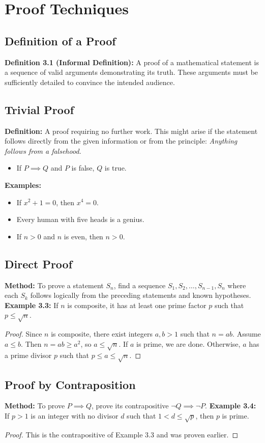 \section{Proof Techniques}

\subsection*{Definition of a Proof}
\textbf{Definition 3.1 (Informal Definition):} A proof of a mathematical statement is a sequence of valid arguments demonstrating its truth. These arguments must be sufficiently detailed to convince the intended audience.

\subsection*{Trivial Proof}
\textbf{Definition:} A proof requiring no further work. This might arise if the statement follows directly from the given information or from the principle: \emph{Anything follows from a falsehood.}
\begin{itemize}
    \item If $P \implies Q$ and $P$ is false, $Q$ is true.
\end{itemize}
\textbf{Examples:}
\begin{itemize}
    \item If $x^2 + 1 = 0$, then $x^4 = 0$.
    \item Every human with five heads is a genius.
    \item If $n > 0$ and $n$ is even, then $n > 0$.
\end{itemize}

\subsection*{Direct Proof}
\textbf{Method:} To prove a statement $S_n$, find a sequence $S_1, S_2, \dots, S_{n-1}, S_n$ where each $S_k$ follows logically from the preceding statements and known hypotheses.
\textbf{Example 3.3:} If $n$ is composite, it has at least one prime factor $p$ such that $p \leq \sqrt{n}$.
\begin{proof}
Since $n$ is composite, there exist integers $a, b > 1$ such that $n = ab$. Assume $a \leq b$. Then $n = ab \geq a^2$, so $a \leq \sqrt{n}$. If $a$ is prime, we are done. Otherwise, $a$ has a prime divisor $p$ such that $p \leq a \leq \sqrt{n}$.
\end{proof}

\subsection*{Proof by Contraposition}
\textbf{Method:} To prove $P \implies Q$, prove its contrapositive $\neg Q \implies \neg P$.
\textbf{Example 3.4:} If $p > 1$ is an integer with no divisor $d$ such that $1 < d \leq \sqrt{p}$, then $p$ is prime.
\begin{proof}
This is the contrapositive of Example 3.3 and was proven earlier.
\end{proof}

